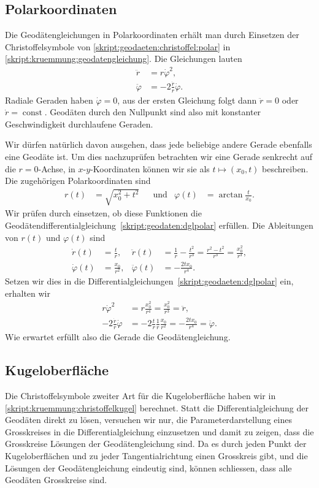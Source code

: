 \subsection{Polarkoordinaten}
Die Geodätengleichungen in Polarkoordinaten erhält man durch
Einsetzen der Christoffelsymbole von
\eqref{skript:geodaeten:christoffel:polar}
in
\eqref{skript:kruemmung:geodatengleichung}.
Die Gleichungen lauten
\begin{equation}
\begin{aligned}
\ddot r &= r\dot \varphi^2,
\\
\ddot \varphi &= -2\frac{\dot r}{r}\dot\varphi.
\end{aligned}
\label{skript:geodaeten:dglpolar}
\end{equation}
Radiale Geraden haben $\dot\varphi=0$, aus der ersten Gleichung folgt dann
$\ddot r=0$ oder $\dot r=\operatorname{const}$.
Geodäten durch den Nullpunkt sind also mit konstanter Geschwindigkeit
durchlaufene Geraden.

Wir dürfen natürlich davon ausgehen, dass jede beliebige andere Gerade
ebenfalls eine Geodäte ist.
Um dies nachzuprüfen betrachten wir eine Gerade senkrecht auf die
$r=0$-Achse, in $x$-$y$-Koordinaten können wir sie als
$t\mapsto (x_0,t)$ beschreiben.
Die zugehörigen Polarkoordinaten sind
\[
\begin{aligned}
r(t)&=\sqrt{x_0^2+t^2}
&&\text{und}&
\varphi(t)&=\arctan\frac{t}{x_0}.
\end{aligned}
\]
Wir prüfen durch einsetzen, ob diese Funktionen die
Geodätendifferentialgleichung~\eqref{skript:geodaten:dglpolar}
erfüllen.
Die Ableitungen von $r(t)$ und $\varphi(t)$ sind
\begin{align*}
\dot r(t)
&=\frac{t}{r},
&
\ddot r(t)
&=
\frac{1}{r}-\frac{t^2}{r^3}
=
\frac{r^2-t^2}{r^3}
=
\frac{x_0^2}{r^3},
\\
\dot\varphi(t)
&=
\frac{x_0}{r^2},
&
\ddot\varphi(t)
&=
-\frac{2tx_0}{r^4}.
\end{align*}
Setzen wir dies in die
Differentialgleichungen~\eqref{skript:geodaeten:dglpolar}
ein, erhalten wir
\begin{align*}
r\dot\varphi^2
&=
r\frac{x_0^2}{r^4}
=
\frac{x_0^2}{r^3}
=
\ddot r,
\\
-2\frac{\dot r}{r}\dot\varphi
&=
-2\frac{t}{r}\frac1{r}\frac{x_0}{r^2}
=
-\frac{2tx_0}{r^4}
=
\ddot\varphi.
\end{align*}
Wie erwartet erfüllt also die Gerade die Geodätengleichung.

\subsection{Kugeloberfläche}
Die Christoffelsymbole zweiter Art für die Kugeloberfläche haben wir
in \eqref{skript:kruemmung:christoffelkugel} berechnet.
Statt die Differentialgleichung der Geodäten direkt zu lösen, versuchen
wir nur, die Parameterdarstellung eines Grosskreises in die
Differentialgleichung einzusetzen und damit zu zeigen, dass die
Grosskreise Lösungen der Geodätengleichung sind.
Da es durch jeden Punkt der Kugeloberflächen und zu jeder Tangentialrichtung
einen Grosskreis gibt, und die Lösungen der Geodätengleichung eindeutig
sind, können schliessen, dass alle Geodäten Grosskreise sind.

